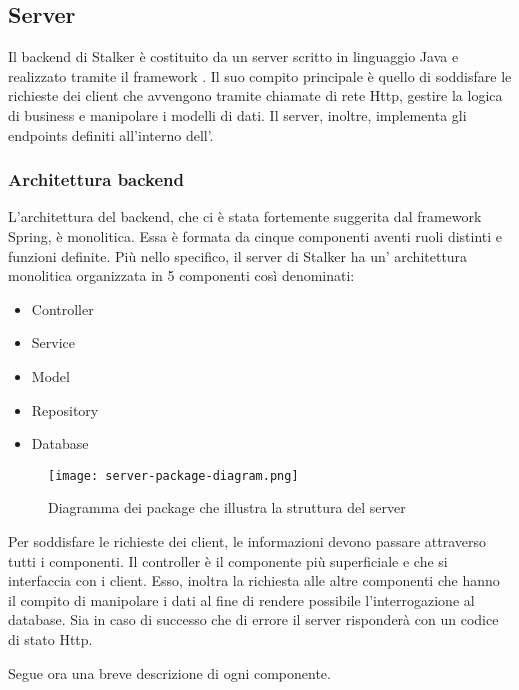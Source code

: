 \documentclass[../../manuale-manutentore.tex]{subfiles}
\begin{document}
\subsection{Server}%
\label{sub:architettura/server}

Il backend di Stalker è costituito da un server scritto in linguaggio Java e realizzato tramite il framework .
Il suo compito principale è quello di  soddisfare le richieste dei client che avvengono tramite chiamate di rete Http, gestire la logica di business e manipolare i modelli di dati.
Il server, inoltre, implementa gli endpoints definiti all'interno dell'.

\subsubsection{Architettura backend}%
\label{architettura_backend}

L'architettura del backend, che ci è stata fortemente suggerita dal framework Spring, è monolitica.
Essa è formata da cinque componenti aventi ruoli distinti e funzioni definite.
Più nello specifico, il server di Stalker ha un' architettura monolitica organizzata in 5 componenti così denominati:
\begin{itemize}
  \item Controller
  \item Service
  \item Model
  \item Repository
  \item Database
\end{itemize}

\begin{figure}[H]
  \centering
  \texttt{[image: server-package-diagram.png]}
  \caption{Diagramma dei package che illustra la struttura del server}%
   \label{fig:diagramma dei package che illustra la struttura del server}
\end{figure}

Per soddisfare le richieste dei client, le informazioni devono passare attraverso tutti i componenti.
Il controller è il componente più superficiale e che si interfaccia con i client.
Esso, inoltra la richiesta alle altre componenti che hanno il compito di manipolare i dati al fine di rendere possibile l'interrogazione al database.
Sia in caso di successo che di errore il server risponderà con un codice di stato Http.

Segue ora una breve descrizione di ogni componente.
\end{document}
